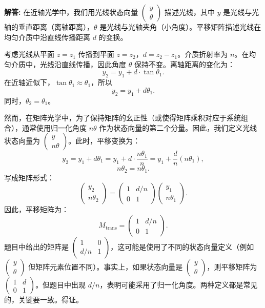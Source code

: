 \documentclass[12pt, a4paper, oneside]{ctexart}
\newenvironment{solution}{\par\noindent\textbf{解答:}\quad}{\par}
\begin{document}
\begin{solution}
    在近轴光学中，我们用光线状态向量 $\begin{pmatrix} y \\ \theta \end{pmatrix}$ 描述光线，其中 $y$ 是光线与光轴的垂直距离（离轴距离），$\theta$ 是光线与光轴夹角（小角度）。平移矩阵描述光线在均匀介质中沿直线传播距离 $d$ 的变换。

    考虑光线从平面 $z=z_1$ 传播到平面 $z=z_2$，$d = z_2 - z_1$。介质折射率为 $n$。在均匀介质中，光线沿直线传播，因此角度 $\theta$ 保持不变。离轴距离的变化为：
    \[
    y_2 = y_1 + d \cdot \tan\theta_1.
    \]
    在近轴近似下，$\tan\theta_1 \approx \theta_1$，所以
    \[
    y_2 = y_1 + d \theta_1.
    \]
    同时，$\theta_2 = \theta_1$。

    然而，在矩阵光学中，为了保持矩阵的幺正性（或使得矩阵乘积对应于系统组合），通常使用归一化角度 $n\theta$ 作为状态向量的第二个分量。因此，我们定义光线状态向量为 $\begin{pmatrix} y \\ n\theta \end{pmatrix}$。此时，平移变换为：
    \[
    y_2 = y_1 + d \theta_1 = y_1 + d \cdot \frac{n\theta_1}{n} = y_1 + \frac{d}{n} (n\theta_1),
    \]
    \[
    n\theta_2 = n\theta_1.
    \]
    写成矩阵形式：
    \[
    \begin{pmatrix} y_2 \\ n\theta_2 \end{pmatrix} = \begin{pmatrix} 1 & d/n \\ 0 & 1 \end{pmatrix} \begin{pmatrix} y_1 \\ n\theta_1 \end{pmatrix}.
    \]
    因此，平移矩阵为：
    \[
    M_{\text{trans}} = \begin{pmatrix} 1 & d/n \\ 0 & 1 \end{pmatrix}.
    \]
    题目中给出的矩阵是 $\begin{pmatrix} 1 & 0 \\ d/n & 1 \end{pmatrix}$，这可能是使用了不同的状态向量定义（例如 $\begin{pmatrix} y \\ \theta \end{pmatrix}$ 但矩阵元素位置不同）。事实上，如果状态向量是 $\begin{pmatrix} y \\ \theta \end{pmatrix}$，则平移矩阵为 $\begin{pmatrix} 1 & d \\ 0 & 1 \end{pmatrix}$。但题目中出现 $d/n$，表明可能采用了归一化角度。两种定义都是常见的，关键要一致。得证。
\end{solution}
\end{document}
